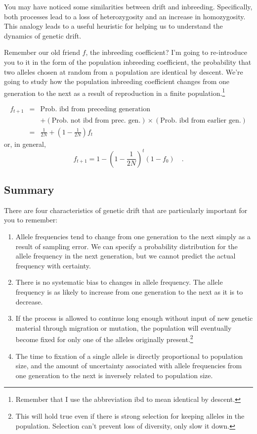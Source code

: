 You may have noticed some similarities between drift and
inbreeding. Specifically, both processes lead to a loss of
heterozygosity and an increase in homozygosity. This analogy leads to
a useful heuristic for helping us to understand the dynamics of
genetic drift.

Remember our old friend $f$, the inbreeding coefficient? I'm going to
re-introduce you to it in the form of the population inbreeding
coefficient, the probability that two alleles chosen at random from a
population are identical by descent. We're going to study how the
population inbreeding coefficient changes from one generation to the
next as a result of reproduction in a finite
population.\footnote{Remember that I use the abbreviation ibd to mean
identical by descent.}

\begin{eqnarray*}
f_{t+1} &=& \mbox{Prob. ibd from preceding generation} \\
        &&  + (\mbox{Prob. not ibd from prec. gen.}) \times (\mbox{Prob. ibd from
          earlier gen.}) \\
   &=& \frac{1}{2N} + \left(1 - \frac{1}{2N}\right)f_t
\end{eqnarray*}
or, in general,
\[
f_{t+1} = 1 - \left(1 - \frac{1}{2N}\right)^t(1-f_0) \quad .
\]

\subsection*{Summary}

There are four characteristics of genetic drift that are particularly
important for you to remember:

\begin{enumerate}

\item Allele frequencies tend to change from one generation to the
next simply as a result of sampling error. We can specify a
probability distribution for the allele frequency in the next
generation, but we cannot predict the actual frequency with certainty.

\item There is no systematic bias to changes in allele frequency. The
allele frequency is as likely to increase from one generation to the
next as it is to decrease.

\item If the process is allowed to continue long enough without input
of new genetic material through migration or mutation, the population
will eventually become fixed for only one of the alleles originally
present.\footnote{This will hold true even if there is strong
selection for keeping alleles in the population. Selection can't
prevent loss of diversity, only slow it down.}

\item The time to fixation of a single allele is directly proportional
to population size, and the amount of uncertainty associated with
allele frequencies from one generation to the next is inversely
related to population size.

\end{enumerate}

